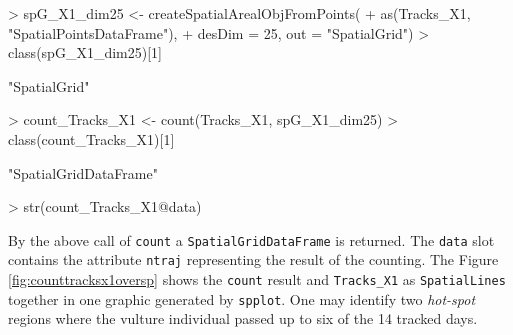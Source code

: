 \documentclass[12pt, oneside, a4paper]{scrbook}
\let\code=\texttt
\begin{document}
\par\medskip



\begin{small}
\begin{Schunk}
\begin{Sinput}
> spG_X1_dim25 <- createSpatialArealObjFromPoints(
+   as(Tracks_X1, "SpatialPointsDataFrame"), 
+   desDim = 25, out = "SpatialGrid")
> class(spG_X1_dim25)[1]
\end{Sinput}
\begin{Soutput}
[1] "SpatialGrid"
\end{Soutput}
\begin{Sinput}
> count_Tracks_X1 <- count(Tracks_X1, spG_X1_dim25)
> class(count_Tracks_X1)[1]
\end{Sinput}
\begin{Soutput}
[1] "SpatialGridDataFrame"
\end{Soutput}
\begin{Sinput}
> str(count_Tracks_X1@data)
\end{Sinput}
\end{Schunk}
\end{small}

\par\medskip

By the above call of \code{count} a \code{SpatialGridDataFrame} is returned. The \code{data} slot contains the attribute \code{ntraj} representing the result of the counting. The Figure \ref{fig:counttracksx1oversp} shows the \code{count} result and \code{Tracks\_X1} as \code{SpatialLines} together in one graphic generated by \code{spplot}. One may identify two \textit{hot-spot} regions where the vulture individual passed up to six of the 14 tracked days.

\par\medskip
\end{document}
